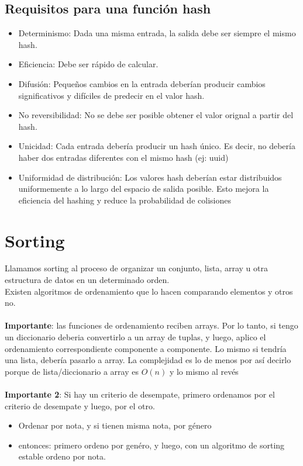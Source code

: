 \documentclass[10pt,a4paper]{article}
\begin{document}
\subsection*{Requisitos para una función hash}
\begin{itemize}
    \item Determinismo: Dada una misma entrada, la salida debe ser siempre el mismo hash.
    \item Eficiencia: Debe ser rápido de calcular.
    \item Difusión: Pequeños cambios en la entrada deberían producir cambios significativos y difíciles de predecir en el valor hash. 
    \item No reversibilidad: No se debe ser posible obtener el valor orignal a partir del hash. 
    \item Unicidad: Cada entrada debería producir un hash único. Es decir, no debería haber dos entradas diferentes con el mismo hash (ej: uuid)
    \item Uniformidad de distribución: Los valores hash deberían estar distribuidos uniformemente a lo largo del espacio de salida posible. Esto mejora la eficiencia del hashing y reduce la probabilidad de colisiones
\end{itemize}
\section*{Sorting}
Llamamos sorting al proceso de organizar un conjunto, lista, array u otra estructura de datos en un determinado orden. \\
Existen algoritmos de ordenamiento que lo hacen comparando elementos y otros no. \\ \\
\textbf{Importante}: las funciones de ordenamiento reciben arrays. Por lo tanto, si tengo un diccionario deberia convertirlo a un array de tuplas, y luego, aplico el ordenamiento correspondiente componente a componente. Lo mismo si tendría una lista, debería pasarlo a array. La complejidad es lo de menos por así decirlo porque de lista/diccionario a array es $O(n)$ y lo mismo al revés \\ \\
\textbf{Importante 2}: Si hay un criterio de desempate, primero ordenamos por el criterio de desempate y luego, por el otro.
\begin{itemize}
    \item Ordenar por nota, y si tienen misma nota, por género
    \item entonces: primero ordeno por genéro, y luego, con un algoritmo de sorting estable ordeno por nota.
\end{itemize}
\end{document}
